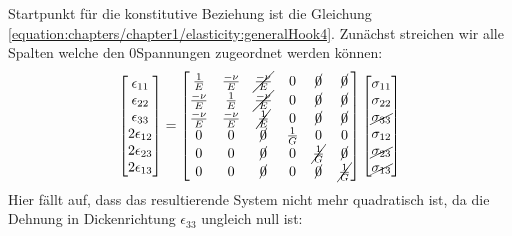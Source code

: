 \documentclass[letterpaper,10pt,german]{jupyterBook}
\begin{document}
\sphinxAtStartPar
Startpunkt für die konstitutive Beziehung ist die Gleichung \eqref{equation:chapters/chapter1/elasticity:generalHook4}. Zunächst streichen wir alle Spalten welche den 0\sphinxhyphen{}Spannungen zugeordnet werden können:
\begin{equation}\label{equation:chapters/chapter1/elasticity:generalHookESZ1}
\begin{split}\begin{bmatrix} 
\epsilon_{11} \\
\epsilon_{22} \\
\epsilon_{33} \\
2\epsilon_{12} \\
2\epsilon_{23} \\
2\epsilon_{13} 
\end{bmatrix} = \begin{bmatrix}
\frac{1}{E} & \frac{-\nu}{E} & \cancel{\frac{-\nu}{E}} & 0 & \cancel{0} & \cancel{0} \\
\frac{-\nu}{E} & \frac{1}{E} & \cancel{\frac{-\nu}{E}} & 0 & \cancel{0} & \cancel{0} \\
{\frac{-\nu}{E}} & {\frac{-\nu}{E}} & \cancel{\frac{1}{E}} & {0} & \cancel{0} & \cancel{0} \\
0 & 0 & \cancel{0} & \frac{1}{G} & 0 & 0 \\
{0} & {0} & \cancel{0} & {0} & \cancel{\frac{1}{G}} & \cancel{0} \\
{0} & {0} & \cancel{0} & {0} & \cancel{0} & \cancel{\frac{1}{G}} \\ 
\end{bmatrix} \begin{bmatrix} \sigma_{11} \\ \sigma_{22} \\ \cancel{\sigma_{33}} \\ \sigma_{12} \\ \cancel{\sigma_{23}} \\ \cancel{\sigma_{13}} \end{bmatrix}\end{split}
\end{equation}
\sphinxAtStartPar
Hier fällt auf, dass das resultierende System nicht mehr quadratisch ist, da die Dehnung in Dickenrichtung \(\epsilon_{33}\) ungleich null ist:
\end{document}
